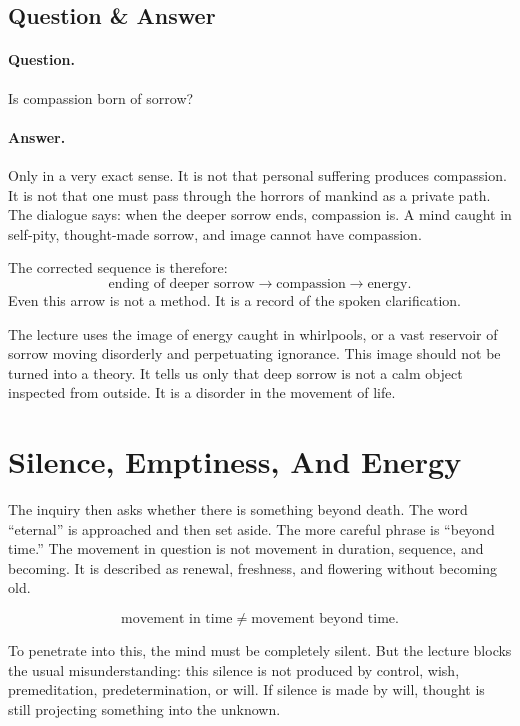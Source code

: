 \documentclass[11pt,oneside]{book}
\begin{document}
\subsection{Question \& Answer}

\paragraph{Question.}
Is compassion born of sorrow?

\paragraph{Answer.}
Only in a very exact sense. It is not that personal suffering produces compassion. It is not that one must pass through the horrors of mankind as a private path. The dialogue says: when the deeper sorrow ends, compassion is. A mind caught in self-pity, thought-made sorrow, and image cannot have compassion.

The corrected sequence is therefore:
\begin{equation}
\text{ending of deeper sorrow}
\longrightarrow
\text{compassion}
\longrightarrow
\text{energy}.
\end{equation}
Even this arrow is not a method. It is a record of the spoken clarification.

The lecture uses the image of energy caught in whirlpools, or a vast reservoir of sorrow moving disorderly and perpetuating ignorance. This image should not be turned into a theory. It tells us only that deep sorrow is not a calm object inspected from outside. It is a disorder in the movement of life.

\section{Silence, Emptiness, And Energy}

The inquiry then asks whether there is something beyond death. The word ``eternal'' is approached and then set aside. The more careful phrase is ``beyond time.'' The movement in question is not movement in duration, sequence, and becoming. It is described as renewal, freshness, and flowering without becoming old.

\begin{equation}
\text{movement in time}
\neq
\text{movement beyond time}.
\end{equation}

To penetrate into this, the mind must be completely silent. But the lecture blocks the usual misunderstanding: this silence is not produced by control, wish, premeditation, predetermination, or will. If silence is made by will, thought is still projecting something into the unknown.
\end{document}
